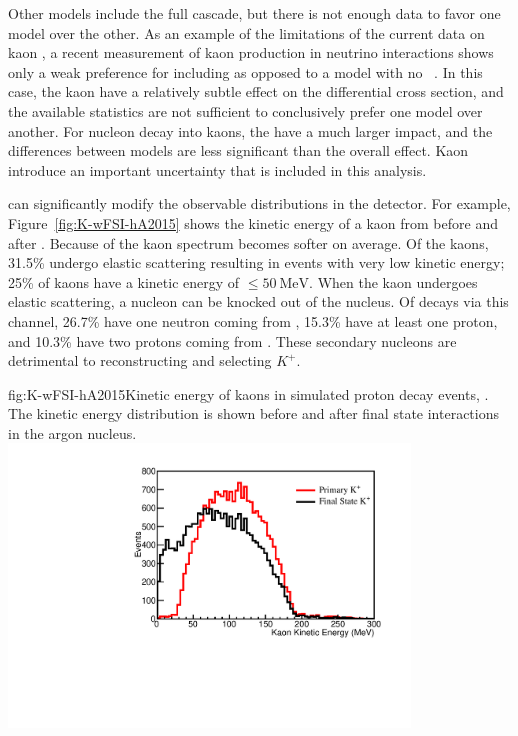 Other  models include the full cascade, but there is not enough data to favor one model over the other.  As an example of the limitations of the current data on kaon , a recent measurement of kaon production in neutrino interactions shows only a weak preference for including  as opposed to a model with no ~\cite{Marshall:2016rrn}.  In this case, the kaon  have a relatively subtle effect on the differential cross section, and the available statistics are not sufficient to conclusively prefer one model over another.  For nucleon decay into kaons, the  have a much larger impact, and the differences between models are less significant than the overall effect.  Kaon  introduce an important uncertainty that is included in this analysis.

 can significantly modify the observable distributions in the detector.  For example, Figure~\ref{fig:K-wFSI-hA2015} shows the kinetic energy of a kaon from \ptoknubar before and after . Because of  the kaon spectrum becomes softer on average. Of the kaons, \num{31.5}\%  undergo elastic scattering resulting in events with very low kinetic energy;  \num{25}\% of kaons have a kinetic energy of $\le\SI{50}{\MeV}$. When the kaon undergoes elastic scattering, a nucleon can be knocked out of the nucleus. Of decays via this channel, \num{26.7}\%  have one neutron coming from , \num{15.3}\% have at least one proton, and \num{10.3}\% have two protons coming from . These secondary nucleons are detrimental to reconstructing and selecting  $K^{+}$.

\begin{dunefigure}{fig:K-wFSI-hA2015}{Kinetic energy of kaons in simulated proton decay events, \ptoknubar.  The kinetic energy distribution is shown before and after final state interactions in the argon nucleus.}
\includegraphics[width=0.8\textwidth]{graphics/K-wFSI-hA2015.pdf}
\end{dunefigure}

